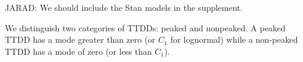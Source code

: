 \documentclass[useAMS,usenatbib,referee,12pt]{article}
\newcommand{\adam}[1]{{\color{blue} ADAM: #1}}
\newcommand{\jarad}[1]{{\color{Orange} JARAD: #1}}
\newcommand{\vX}{\textbf{X}}
\newcommand{\vZ}{\textbf{Z}}
\newcommand{\vbeta}{\boldsymbol{\beta}}
\newcommand{\vxi}{\boldsymbol{\xi}}
\begin{document}
\jarad{We should include the Stan models in the supplement.}







We distinguish two categories of TTDDs: peaked and nonpeaked.  
A peaked TTDD has a mode greater than zero (or $C_1$ for lognormal) while a non-peaked TTDD has a mode of zero (or less than $C_1$).
\end{document}
